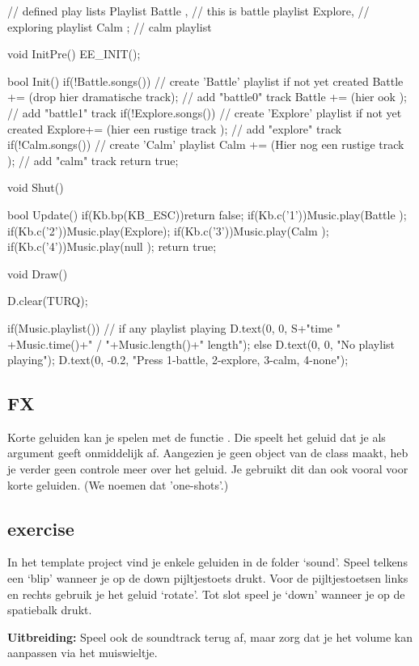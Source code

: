 \begin{code}
// defined play lists
Playlist Battle , // this is battle playlist 
         Explore, // exploring playlist
         Calm   ; // calm playlist

void InitPre()
{
   EE_INIT();
}

bool Init()
{
   if(!Battle.songs())                         // create 'Battle' playlist if not yet created
   {
      Battle += (drop hier dramatische track); // add "battle0" track
      Battle += (hier ook                   ); // add "battle1" track 
   }
   if(!Explore.songs())                        // create 'Explore' playlist if not yet created
   {
      Explore+= (hier een rustige track     ); // add "explore" track 
   }
   if(!Calm.songs())                           // create 'Calm' playlist
   {
      Calm   += (Hier nog een rustige track ); // add "calm" track 
   }
   return true;
}

void Shut()
{
}

bool Update()
{
   if(Kb.bp(KB_ESC))return false;
   if(Kb.c('1'))Music.play(Battle );
   if(Kb.c('2'))Music.play(Explore);
   if(Kb.c('3'))Music.play(Calm   );
   if(Kb.c('4'))Music.play(null   );
   return true;
}

void Draw()
{
   D.clear(TURQ);

   if(Music.playlist()) // if any playlist playing
   {
      D.text(0, 0, S+"time " +Music.time()+" / "+Music.length()+" length");
   }else
   {
      D.text(0, 0, "No playlist playing");
   }
   D.text(0, -0.2, "Press 1-battle, 2-explore, 3-calm, 4-none");
}
\end{code}

\subsection{FX}
Korte geluiden kan je spelen met de functie . Die speelt het geluid dat je als argument geeft onmiddelijk af. Aangezien je geen object van de class  maakt, heb je verder geen controle meer over het geluid. Je gebruikt dit dan ook vooral voor korte geluiden. (We noemen dat 'one-shots'.)

\subsection{exercise}
In het template project vind je enkele geluiden in de folder `sound'. Speel telkens een `blip' wanneer je op de down pijltjestoets drukt. Voor de pijltjestoetsen links en rechts gebruik je het geluid `rotate'. Tot slot speel je `down' wanneer je op de spatiebalk drukt.

\textbf{Uitbreiding:} Speel ook de soundtrack terug af, maar zorg dat je het volume kan aanpassen via het muiswieltje.

 